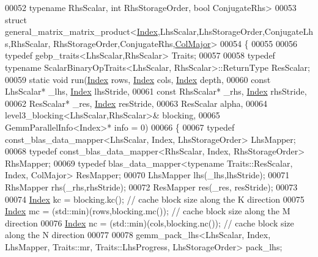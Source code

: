 \begin{DoxyCode}
00052   \textcolor{keyword}{typename} RhsScalar, \textcolor{keywordtype}{int} RhsStorageOrder, \textcolor{keywordtype}{bool} ConjugateRhs>
00053 \textcolor{keyword}{struct }general\_matrix\_matrix\_product<\hyperlink{namespace_eigen_a62e77e0933482dafde8fe197d9a2cfde}{Index},LhsScalar,LhsStorageOrder,ConjugateLhs,RhsScalar,
      RhsStorageOrder,ConjugateRhs,\hyperlink{group__enums_ggaacded1a18ae58b0f554751f6cdf9eb13a0cbd4bdd0abcfc0224c5fcb5e4f6669a}{ColMajor}>
00054 \{
00055 
00056 \textcolor{keyword}{typedef} gebp\_traits<LhsScalar,RhsScalar> Traits;
00057 
00058 \textcolor{keyword}{typedef} \textcolor{keyword}{typename} ScalarBinaryOpTraits<LhsScalar, RhsScalar>::ReturnType ResScalar;
00059 \textcolor{keyword}{static} \textcolor{keywordtype}{void} run(\hyperlink{namespace_eigen_a62e77e0933482dafde8fe197d9a2cfde}{Index} rows, \hyperlink{namespace_eigen_a62e77e0933482dafde8fe197d9a2cfde}{Index} cols, \hyperlink{namespace_eigen_a62e77e0933482dafde8fe197d9a2cfde}{Index} depth,
00060   \textcolor{keyword}{const} LhsScalar* \_lhs, \hyperlink{namespace_eigen_a62e77e0933482dafde8fe197d9a2cfde}{Index} lhsStride,
00061   \textcolor{keyword}{const} RhsScalar* \_rhs, \hyperlink{namespace_eigen_a62e77e0933482dafde8fe197d9a2cfde}{Index} rhsStride,
00062   ResScalar* \_res, \hyperlink{namespace_eigen_a62e77e0933482dafde8fe197d9a2cfde}{Index} resStride,
00063   ResScalar alpha,
00064   level3\_blocking<LhsScalar,RhsScalar>& blocking,
00065   GemmParallelInfo<Index>* info = 0)
00066 \{
00067   \textcolor{keyword}{typedef} const\_blas\_data\_mapper<LhsScalar, Index, LhsStorageOrder> LhsMapper;
00068   \textcolor{keyword}{typedef} const\_blas\_data\_mapper<RhsScalar, Index, RhsStorageOrder> RhsMapper;
00069   \textcolor{keyword}{typedef} blas\_data\_mapper<typename Traits::ResScalar, Index, ColMajor> ResMapper;
00070   LhsMapper lhs(\_lhs,lhsStride);
00071   RhsMapper rhs(\_rhs,rhsStride);
00072   ResMapper res(\_res, resStride);
00073 
00074   \hyperlink{namespace_eigen_a62e77e0933482dafde8fe197d9a2cfde}{Index} kc = blocking.kc();                   \textcolor{comment}{// cache block size along the K direction}
00075   \hyperlink{namespace_eigen_a62e77e0933482dafde8fe197d9a2cfde}{Index} mc = (std::min)(rows,blocking.mc());  \textcolor{comment}{// cache block size along the M direction}
00076   \hyperlink{namespace_eigen_a62e77e0933482dafde8fe197d9a2cfde}{Index} nc = (std::min)(cols,blocking.nc());  \textcolor{comment}{// cache block size along the N direction}
00077 
00078   gemm\_pack\_lhs<LhsScalar, Index, LhsMapper, Traits::mr, Traits::LhsProgress, LhsStorageOrder> pack\_lhs;

\end{DoxyCode}
